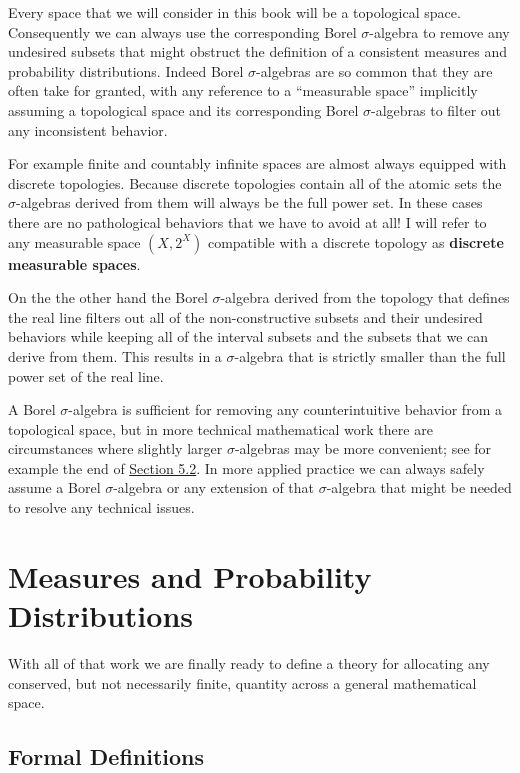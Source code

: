 \documentclass[
  letterpaper,
  DIV=11,
  numbers=noendperiod]{scrartcl}
\begin{document}
Every space that we will consider in this book will be a topological
space. Consequently we can always use the corresponding Borel
\(\sigma\)-algebra to remove any undesired subsets that might obstruct
the definition of a consistent measures and probability distributions.
Indeed Borel \(\sigma\)-algebras are so common that they are often take
for granted, with any reference to a ``measurable space'' implicitly
assuming a topological space and its corresponding Borel
\(\sigma\)-algebras to filter out any inconsistent behavior.

For example finite and countably infinite spaces are almost always
equipped with discrete topologies. Because discrete topologies contain
all of the atomic sets the \(\sigma\)-algebras derived from them will
always be the full power set. In these cases there are no pathological
behaviors that we have to avoid at all! I will refer to any measurable
space \((X, 2^{X})\) compatible with a discrete topology as
\textbf{discrete measurable spaces}.

On the the other hand the Borel \(\sigma\)-algebra derived from the
topology that defines the real line filters out all of the
non-constructive subsets and their undesired behaviors while keeping all
of the interval subsets and the subsets that we can derive from them.
This results in a \(\sigma\)-algebra that is strictly smaller than the
full power set of the real line.

A Borel \(\sigma\)-algebra is sufficient for removing any
counterintuitive behavior from a topological space, but in more
technical mathematical work there are circumstances where slightly
larger \(\sigma\)-algebras may be more convenient; see for example the
end of \href{@sec:lebesgue}{Section 5.2}. In more applied practice we
can always safely assume a Borel \(\sigma\)-algebra or any extension of
that \(\sigma\)-algebra that might be needed to resolve any technical
issues.

\hypertarget{measures-and-probability-distributions}{%
\section{Measures and Probability
Distributions}\label{measures-and-probability-distributions}}

With all of that work we are finally ready to define a theory for
allocating any conserved, but not necessarily finite, quantity across a
general mathematical space.

\hypertarget{formal-definitions}{%
\subsection{Formal Definitions}\label{formal-definitions}}
\end{document}
